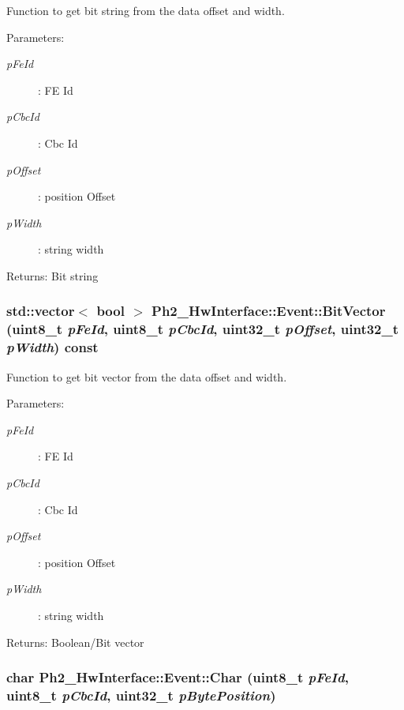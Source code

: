 Function to get bit string from the data offset and width. 

\begin{Desc}
\item[Parameters:]
\begin{description}
\item[{\em p\-Fe\-Id}]: FE Id \item[{\em p\-Cbc\-Id}]: Cbc Id \item[{\em p\-Offset}]: position Offset \item[{\em p\-Width}]: string width \end{description}
\end{Desc}
\begin{Desc}
\item[Returns:]Bit string \end{Desc}
\hypertarget{class_ph2___hw_interface_1_1_event_b83e11f21873bd5beebd1049671ce3da}{
\subsubsection[BitVector]{\setlength{\rightskip}{0pt plus 5cm}std::vector$<$ bool $>$ Ph2\_\-Hw\-Interface::Event::Bit\-Vector (uint8\_\-t {\em p\-Fe\-Id}, uint8\_\-t {\em p\-Cbc\-Id}, uint32\_\-t {\em p\-Offset}, uint32\_\-t {\em p\-Width}) const}}
\label{class_ph2___hw_interface_1_1_event_b83e11f21873bd5beebd1049671ce3da}


Function to get bit vector from the data offset and width. 

\begin{Desc}
\item[Parameters:]
\begin{description}
\item[{\em p\-Fe\-Id}]: FE Id \item[{\em p\-Cbc\-Id}]: Cbc Id \item[{\em p\-Offset}]: position Offset \item[{\em p\-Width}]: string width \end{description}
\end{Desc}
\begin{Desc}
\item[Returns:]Boolean/Bit vector \end{Desc}
\hypertarget{class_ph2___hw_interface_1_1_event_348abea85bdfdfc8c0b88cda907dbea8}{
\subsubsection[Char]{\setlength{\rightskip}{0pt plus 5cm}char Ph2\_\-Hw\-Interface::Event::Char (uint8\_\-t {\em p\-Fe\-Id}, uint8\_\-t {\em p\-Cbc\-Id}, uint32\_\-t {\em p\-Byte\-Position})}}
\label{class_ph2___hw_interface_1_1_event_348abea85bdfdfc8c0b88cda907dbea8}


